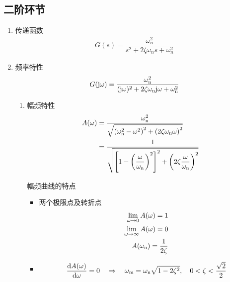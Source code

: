\subsection{二阶环节}
\begin{enumerate}[1.]
	\item 传递函数
	\vspace*{-0.5em}
	\begin{align}
		G(s) = \dfrac{\omega_n^2}{s^2 + 2 \zeta \omega_ns + \omega_n^2}
	\end{align}
	\vspace*{-3em}
	
	\item 频率特性
	\vspace*{-0.5em}
	\begin{align}
		G(\text{j}  \omega) = \dfrac{\omega_{\rm{n}}^2}{(\text{j} \omega)^2 + 2 \zeta \omega_{\rm{n}} \text{j} \omega + \omega_{\rm{n}}^2}
	\end{align}
	\vspace*{-3em}
	\begin{enumerate}[(1) ]
		\item 幅频特性
		\vspace*{-0.5em}
		\begin{equation}
			\begin{split}
				A(\omega) &= \dfrac{\omega_{\rm{n}}^2}{\sqrt{\left(\omega_{\rm{n}}^2 - \omega^2\right)^2 + \left(2 \zeta \omega_{\rm{n}} \omega\right)^2}}\\
				& =  \dfrac{1}{\sqrt{\left[1 - \left(\dfrac{\omega}{\omega_{\rm{n}}}\right)^2\right]^2 + \left(2 \zeta \dfrac{\omega}{\omega_{\rm{n}}}\right)^2}}
			\end{split}
		\end{equation}

		幅频曲线的特点
		\begin{itemize}
			\item 两个极限点及转折点
			\begin{align*}
				\lim\limits_{\omega \to 0} A(\omega) = 1\\
				\lim\limits_{\omega \to \infty} A(\omega) = 0\\
				A(\omega_{\rm{n}}) = \dfrac{1}{2 \zeta}
			\end{align*}
		
			\item {}
			\begin{align}
				\dfrac{{\rm{d}} A(\omega)}{{\rm{d}} \omega} = 0 \quad \Rightarrow \quad \omega_\text{m} = \omega_{\rm{n}} \sqrt{1 - 2 \zeta^2}, \quad 0< \zeta < \dfrac{\sqrt{2}}{2}
				\label{谐振频率}
			\end{align}
		

\end{itemize}
\end{enumerate}
\end{enumerate}
